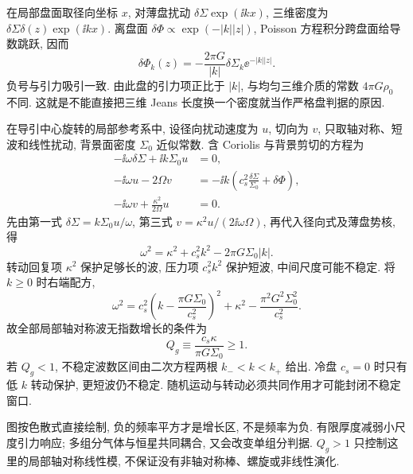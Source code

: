 在局部盘面取径向坐标 $x$, 对薄盘扰动 $\delta\Sigma\exp(\ii kx)$, 三维密度为 $\delta\Sigma\delta(z)\exp(\ii kx)$. 离盘面 $\delta\Phi\propto\exp(-|k||z|)$, Poisson 方程积分跨盘面给导数跳跃, 因而
\[
\delta\Phi_k(z)=-\frac{2\pi G}{|k|}\delta\Sigma_k\ee^{-|k||z|}.
\]
负号与引力吸引一致. 由此盘的引力项正比于 $|k|$, 与均匀三维介质的常数 $4\pi G\rho_0$ 不同. 这就是不能直接把三维 Jeans 长度换一个密度就当作严格盘判据的原因.

在导引中心旋转的局部参考系中, 设径向扰动速度为 $u$, 切向为 $v$, 只取轴对称、短波和线性扰动, 背景面密度 $\Sigma_0$ 近似常数. 含 Coriolis 与背景剪切的方程为
\begin{align*}
-\ii\omega\delta\Sigma+\ii k\Sigma_0u&=0,\\
-\ii\omega u-2\Omega v&=-\ii k\left(c_s^2\frac{\delta\Sigma}{\Sigma_0}+\delta\Phi\right),\\
-\ii\omega v+\frac{\kappa^2}{2\Omega}u&=0.
\end{align*}
先由第一式 $\delta\Sigma=k\Sigma_0u/\omega$, 第三式 $v=\kappa^2u/(2\ii\omega\Omega)$, 再代入径向式及薄盘势核, 得
\[
\omega^2=\kappa^2+c_s^2k^2-2\pi G\Sigma_0|k|.
\]
转动回复项 $\kappa^2$ 保护足够长的波, 压力项 $c_s^2k^2$ 保护短波, 中间尺度可能不稳定. 将 $k\ge0$ 时右端配方,
\[
\omega^2=c_s^2\left(k-\frac{\pi G\Sigma_0}{c_s^2}\right)^2
+\kappa^2-\frac{\pi^2G^2\Sigma_0^2}{c_s^2}.
\]
故全部局部轴对称波无指数增长的条件为
\[
Q_g\equiv\frac{c_s\kappa}{\pi G\Sigma_0}\ge1.
\]
若 $Q_g<1$, 不稳定波数区间由二次方程两根 $k_-<k<k_+$ 给出. 冷盘 $c_s=0$ 时只有低 $k$ 转动保护, 更短波仍不稳定. 随机运动与转动必须共同作用才可能封闭不稳定窗口.

\begin{center}
\end{center}
图按色散式直接绘制, 负的频率平方才是增长区, 不是频率为负. 有限厚度减弱小尺度引力响应; 多组分气体与恒星共同耦合, 又会改变单组分判据. $Q_g>1$ 只控制这里的局部轴对称线性模, 不保证没有非轴对称棒、螺旋或非线性演化.

